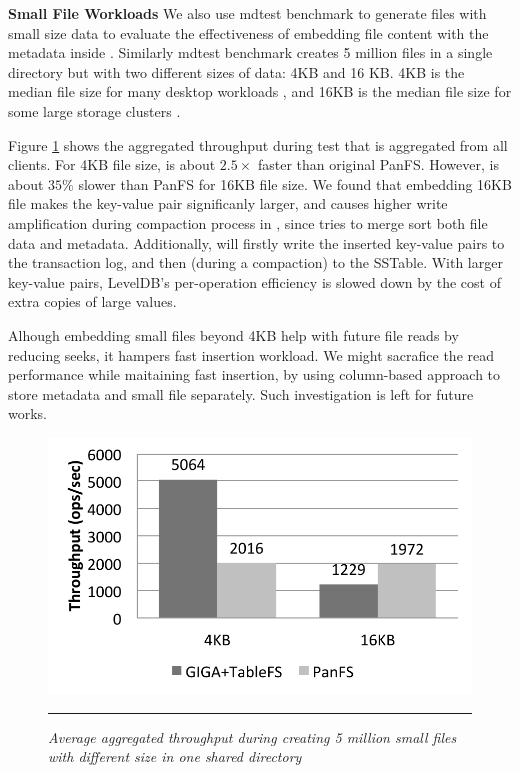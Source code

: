 \textbf{Small File Workloads}
We also use mdtest benchmark to generate files with small size data to evaluate
the effectiveness of embedding file content with the metadata inside \tfs.
Similarly mdtest benchmark creates 5 million files in a single directory
but with two different sizes of data: 4KB and 16 KB.
4KB is the median file size for many desktop workloads \cite{Bill11},
and 16KB is the median file size for some large storage clusters \cite{brent13}.

Figure \ref{graph:smallfiles} shows the aggregated throughput during test
that is aggregated from all clients. For 4KB file size,
\sys is about $2.5\times$ faster than original PanFS.
However, \sys is about $35\%$ slower than PanFS for 16KB file size.
We found that embedding 16KB file makes the key-value pair significanly larger,
and causes higher write amplification during compaction process in \ldb,
since \ldb tries to merge sort both file data and metadata.
Additionally, \ldb will firstly write the inserted key-value pairs
to the transaction log, and then (during a compaction) to the SSTable.
With larger key-value pairs, LevelDB's per-operation efficiency is
slowed down by the cost of extra copies of large values.


Alhough embedding small files beyond 4KB help with
future file reads by reducing seeks, it hampers fast insertion workload.
We might sacrafice the read performance while maitaining fast insertion,
by using column-based approach to store metadata and small file separately.
Such investigation is left for future works.

\begin{figure}[t]  %
\centerline{\includegraphics[scale=0.7]{./figs/small_file_creates}}
\vspace{10pt}
\caption{\normalsize
\textit{Average aggregated throughput during creating 5 million small files
with different size in one shared directory}
}
\vspace{10pt}
\hrule
\label{graph:smallfiles}
\end{figure}       %


